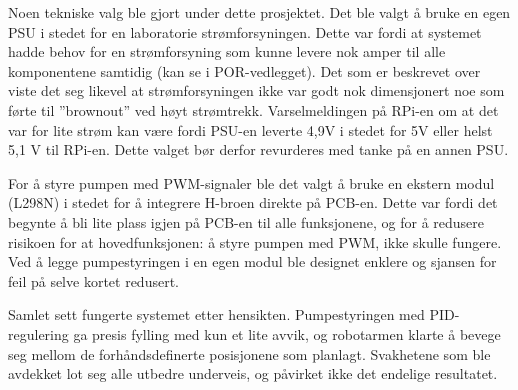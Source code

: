 Noen tekniske valg ble gjort under dette prosjektet. Det ble valgt å bruke en egen PSU i stedet for en laboratorie strømforsyningen. Dette var fordi at systemet hadde behov for en strømforsyning som kunne levere nok amper til alle komponentene samtidig (kan se i POR-vedlegget). Det som er beskrevet over viste det seg likevel at strømforsyningen ikke var godt nok dimensjonert noe som førte til ''brownout'' ved høyt strømtrekk. Varselmeldingen på RPi-en om at det var for lite strøm kan være fordi PSU-en leverte 4,9V i stedet for 5V eller helst 5,1 V til RPi-en. Dette valget bør derfor revurderes med tanke på en annen PSU.

For å styre pumpen med PWM-signaler ble det valgt å bruke en ekstern modul (L298N) i stedet for å integrere H-broen direkte på PCB-en. Dette var fordi det begynte å bli lite plass igjen på PCB-en til alle funksjonene, og for å redusere risikoen for at hovedfunksjonen: å styre pumpen med PWM, ikke skulle fungere. Ved å legge pumpestyringen i en egen modul ble designet enklere og sjansen for feil på selve kortet redusert.

Samlet sett fungerte systemet etter hensikten. Pumpestyringen med PID-regulering ga presis fylling med kun et lite avvik, og robotarmen klarte å bevege seg mellom de forhåndsdefinerte posisjonene som planlagt. Svakhetene som ble avdekket lot seg alle utbedre underveis, og påvirket ikke det endelige resultatet.